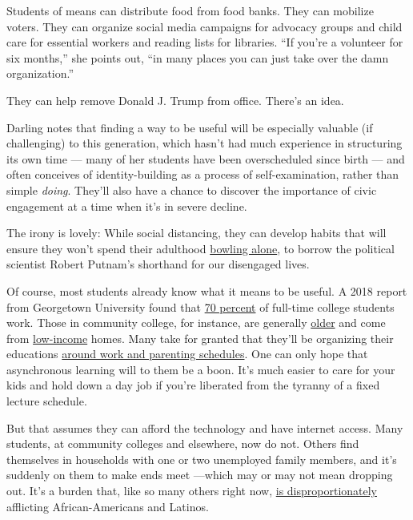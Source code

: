 Students of means can distribute food from food banks. They can mobilize
voters. They can organize social media campaigns for advocacy groups and
child care for essential workers and reading lists for libraries. ``If
you're a volunteer for six months,'' she points out, ``in many places
you can just take over the damn organization.''

They can help remove Donald J. Trump from office. There's an idea.

Darling notes that finding a way to be useful will be especially
valuable (if challenging) to this generation, which hasn't had much
experience in structuring its own time --- many of her students have
been overscheduled since birth --- and often conceives of
identity-building as a process of self-examination, rather than simple
\emph{doing}. They'll also have a chance to discover the importance of
civic engagement at a time when it's in severe decline.

The irony is lovely: While social distancing, they can develop habits
that will ensure they won't spend their adulthood
\href{http://-fabric-political-scientist-renews-his-alarm.html/}{bowling
alone}, to borrow the political scientist Robert Putnam's shorthand for
our disengaged lives.

Of course, most students already know what it means to be useful. A 2018
report from Georgetown University found that
\href{https://www.insidehighered.com/news/2019/11/18/most-college-students-work-and-thats-both-good-and-bad\#:~:text=The\%20Georgetown\%20report\%20found\%20that,time\%20college\%20students\%20are\%20working.}{70
percent} of full-time college students work. Those in community college,
for instance, are generally
\href{https://www.usnews.com/education/community-colleges/articles/2015/02/06/frequently-asked-questions-community-college}{older}
and come from
\href{https://ccrc.tc.columbia.edu/Community-College-FAQs.html}{low-income}
homes. Many take for granted that they'll be organizing their educations
\href{https://iwpr.org/publications/parents-college-numbers/\#:~:text=Today's\%20Student\%20Parent\%20Population,National\%20Postsecondary\%20Student\%20Aid\%20Study.}{around
work and parenting schedules}. One can only hope that asynchronous
learning will to them be a boon. It's much easier to care for your kids
and hold down a day job if you're liberated from the tyranny of a fixed
lecture schedule.

But that assumes they can afford the technology and have internet
access. Many students, at community colleges and elsewhere, now do not.
Others find themselves in households with one or two unemployed family
members, and it's suddenly on them to make ends meet ---which may or may
not mean dropping out. It's a burden that, like so many others right
now,
\href{https://www.insidehighered.com/news/2020/06/17/pandemic-has-worsened-equity-gaps-higher-education-and-work}{is
disproportionately} afflicting African-Americans and Latinos.

